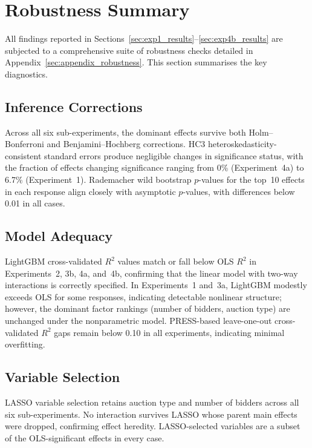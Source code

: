 \section{Robustness Summary}
\label{sec:robustness}

All findings reported in Sections~\ref{sec:exp1_results}--\ref{sec:exp4b_results} are subjected to a comprehensive suite of robustness checks detailed in Appendix~\ref{sec:appendix_robustness}. This section summarises the key diagnostics.

\subsection{Inference Corrections}

Across all six sub-experiments, the dominant effects survive both Holm--Bonferroni and Benjamini--Hochberg corrections. HC3 heteroskedasticity-consistent standard errors produce negligible changes in significance status, with the fraction of effects changing significance ranging from 0\% (Experiment~4a) to 6.7\% (Experiment~1). Rademacher wild bootstrap $p$-values for the top~10 effects in each response align closely with asymptotic $p$-values, with differences below 0.01 in all cases.

\subsection{Model Adequacy}

LightGBM cross-validated $R^2$ values match or fall below OLS $R^2$ in Experiments~2, 3b, 4a, and~4b, confirming that the linear model with two-way interactions is correctly specified. In Experiments~1 and~3a, LightGBM modestly exceeds OLS for some responses, indicating detectable nonlinear structure; however, the dominant factor rankings (number of bidders, auction type) are unchanged under the nonparametric model. PRESS-based leave-one-out cross-validated $R^2$ gaps remain below 0.10 in all experiments, indicating minimal overfitting.

\subsection{Variable Selection}

LASSO variable selection retains auction type and number of bidders across all six sub-experiments. No interaction survives LASSO whose parent main effects were dropped, confirming effect heredity. LASSO-selected variables are a subset of the OLS-significant effects in every case.

